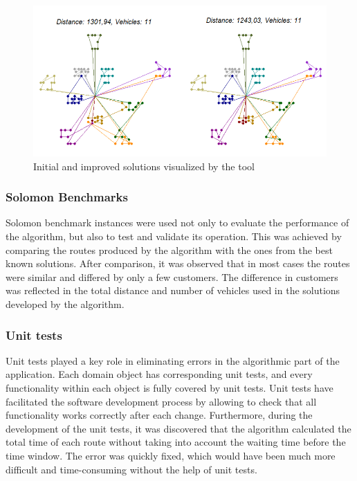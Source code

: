\documentclass[a4paper,twoside,12pt]{book}
\begin{document}
\begin{figure}[H]
\centering
\includegraphics[width=\textwidth]{images/visualizationTestExample.png}
\caption{Initial and improved solutions visualized by the tool}
\label{fig:visualizationTestExample}
\end{figure}

\subsubsection{Solomon Benchmarks}
Solomon benchmark instances were used not only to evaluate the performance of the algorithm, but also to test and validate its operation. This was achieved by comparing the routes produced by the algorithm with the ones from the best known solutions. After comparison, it was observed that in most cases the routes were similar and differed by only a few customers. The difference in customers was reflected in the total distance and number of vehicles used in the solutions developed by the algorithm.

\subsubsection{Unit tests}
Unit tests played a key role in eliminating errors in the algorithmic part of the application. Each domain object has corresponding unit tests, and every functionality within each object is fully covered by unit tests. Unit tests have facilitated the software development process by allowing to check that all functionality works correctly after each change. Furthermore, during the development of the unit tests, it was discovered that the algorithm calculated the total time of each route without taking into account the waiting time before the time window. The error was quickly fixed, which would have been much more difficult and time-consuming without the help of unit tests.
\end{document}
